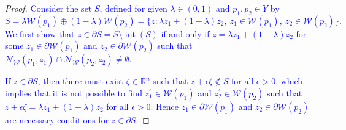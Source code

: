 \documentclass[smallextended]{svjour3}       %
\numberwithin{equation}{section}
\DeclareMathOperator{\interior}{int}
\newcommand{\revision}[1]{\textcolor{blue}{#1}}
\begin{document}
%
\begin{proof}\def\W{\mathcal{W}}\def\N{\mathcal{N}}
% 
  \revision{
    Consider the set $S$, defined for given $\lambda\in (0,1)$ and $p_1,p_2\in Y$ by
    \[
      S = \lambda \mathcal{W}(p_1) \oplus (1-\lambda) \mathcal{W}(p_2) 
      = \bigl\{ z : \lambda z_1 + (1 - \lambda) z_2, \ z_1 \in\mathcal W(p_1), \ z_2 \in\mathcal W(p_2) \bigr\} .
    \]
    We first show that $z\in \partial S = S \setminus \interior(S)$ if and only if
    $z = \lambda z_1 + (1 - \lambda) z_2$ for some $z_1\in\partial \mathcal W(p_1)$ and $z_2\in\partial \mathcal W(p_2)$ such that $\mathcal N_{\mathcal W}(p_1,z_1) \cap \mathcal N_{\mathcal W}(p_2,z_2) \neq \emptyset$.}
  
  \revision{If $z\in\partial S$, then there must exist $\zeta\in\mathbb R^n$ such that $z + \epsilon \zeta \notin S$ for all $\epsilon > 0$, which implies that it is not possible to find $z_1^\prime\in \mathcal{W}(p_1)$ and $z_2^\prime\in \mathcal{W}(p_2)$ such that $z + \epsilon \zeta =  \lambda z_1^\prime + (1 - \lambda) z_2^\prime$ for all $\epsilon > 0$. Hence $z_1\in\partial\W(p_1)$ and $z_2\in\partial\W(p_2)$ are necessary conditions for $z\in\partial S$.}


\end{proof}
\end{document}
